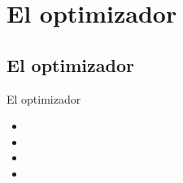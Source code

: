 \section{El optimizador}

\subsection{El optimizador}
\begin{frame}{El optimizador}
  \begin{itemize}
    \item 
    \item 
    \item 
    \item 
  \end{itemize}
\end{frame}
